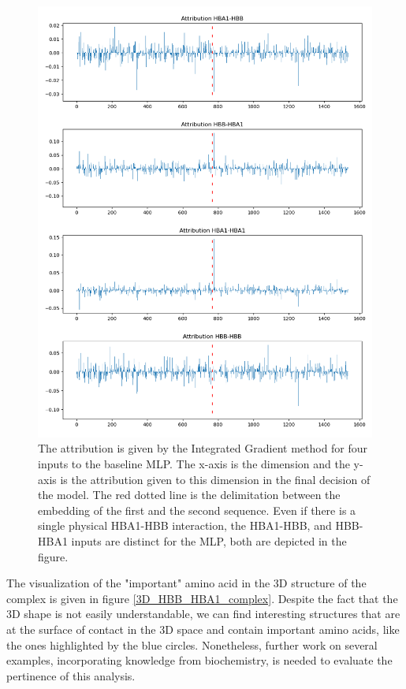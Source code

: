 \documentclass[11pt,a4paper]{article}
\begin{document}
\begin{figure}[ht]
\centering
\includegraphics[width=\textwidth]{images/attribution_profil_annotated.png}
\caption{The attribution is given by the Integrated Gradient method for four inputs to the baseline MLP. The x-axis is the dimension and the y-axis is the attribution given to this dimension in the final decision of the model. The red dotted line is the delimitation between the embedding of the first and the second sequence. Even if there is a single physical HBA1-HBB interaction, the HBA1-HBB, and HBB-HBA1 inputs are distinct for the MLP, both are depicted in the figure.}
\label{attribution_profils}
\end{figure}


The visualization of the "important" amino acid in the 3D structure of the complex is given in figure \ref{3D_HBB_HBA1_complex}. Despite the fact that the 3D shape is not easily understandable, we can find interesting structures that are at the surface of contact in the 3D space and contain important amino acids, like the ones highlighted by the blue circles. Nonetheless, further work on several examples, incorporating knowledge from biochemistry, is needed to evaluate the pertinence of this analysis. 
\end{document}
